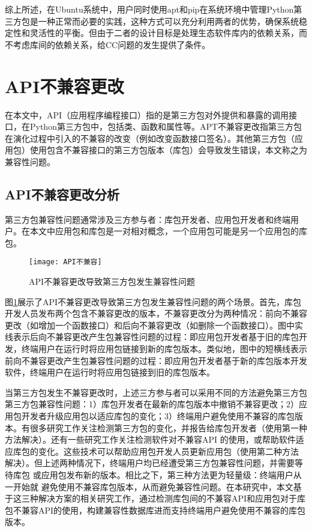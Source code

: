 综上所述，在Ubuntu系统中，用户同时使用apt和pip在系统环境中管理Python第三方包是一种正常而必要的实践，这种方式可以充分利用两者的优势，确保系统稳定性和灵活性的平衡。但由于二者的设计目标是处理生态软件库内的依赖关系，而不考虑库间的依赖关系，给CC问题的发生提供了条件。

\section{API不兼容更改}
在本文中，API（应用程序编程接口）指的是第三方包对外提供和暴露的调用接口，在Python第三方包中，包括类、函数和属性等。APT不兼容更改指第三方包在演化过程中引入的不兼容的改变（例如改变函数接口签名）。其他第三方包（应用包）使用包含不兼容接口的第三方包版本（库包）会导致发生错误，本文称之为兼容性问题。

\subsection{API不兼容更改分析}
第三方包兼容性问题通常涉及三方参与者：库包开发者、应用包开发者和终端用户。在本文中应用包和库包是一对相对概念，一个应用包可能是另一个应用包的库包。
\begin{figure}[t] %
	\centering
	\texttt{[image: API不兼容]}
	\caption{API不兼容更改导致第三方包发生兼容性问题}
	\label{fig:API}
\end{figure}
图\ref{fig:API}展示了API不兼容更改导致第三方包发生兼容性问题的两个场景。首先，库包开发人员发布两个包含不兼容更改的版本，不兼容更改分为两种情况：前向不兼容更改（如增加一个函数接口）和后向不兼容更改（如删除一个函数接口）。图中实线表示后向不兼容更改产生包兼容性问题的过程：即应用包开发者基于旧的库包开发，终端用户在运行时将应用包链接到新的库包版本。类似地，图中的短横线表示前向不兼容更改产生包兼容性问题的过程：即应用包开发者基于新的库包版本开发软件，终端用户在运行时将应用包链接到旧的库包版本。

当第三方包发生不兼容更改时，上述三方参与者可以采用不同的方法避免第三方包第三方包兼容性问题：1）库包开发者在最新的库包版本中撤销不兼容更改；2）应用包开发者升级应用包以适应库包的变化；3）终端用户避免使用不兼容的库包版本。有很多研究工作关注检测第三方包的变化，并报告给库包开发者（使用第一种方法解决）。还有一些研究工作关注检测软件对不兼容API 的使用，或帮助软件适应库包的变化。这些技术可以帮助应用包开发人员更新应用包（使用第二种方法
解决）。但上述两种情况下，终端用户均已经遭受第三方包兼容性问题，并需要等待库包
或应用包发布新的版本。相比之下，第三种方法更为轻量级：终端用户从一开始就
避免使用不兼容库包版本，从而避免兼容性问题。在本研究中，本文基于这三种解决方案的相关研究工作，通过检测库包间的不兼容API和应用包对于库包不兼容API的使用，构建兼容性数据库进而支持终端用户避免使用不兼容的库包版本。


